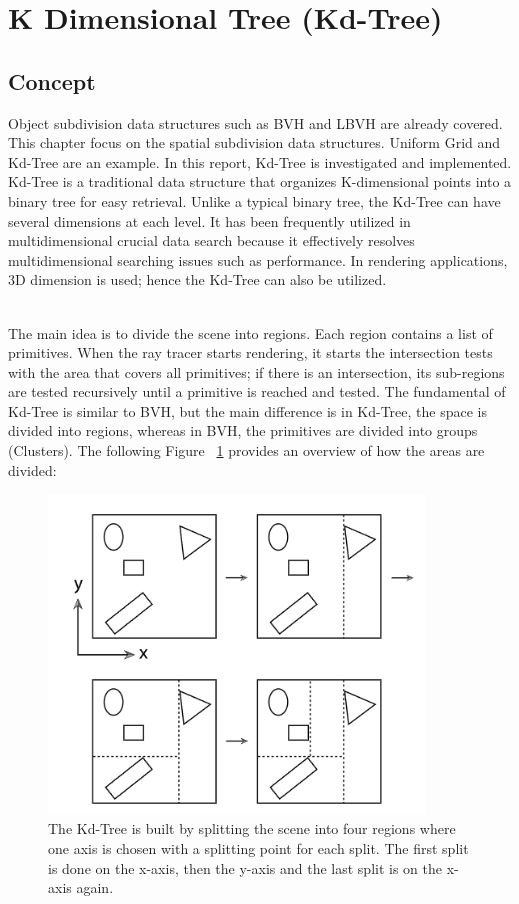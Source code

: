 \documentclass[11pt,a4paper]{article}
\begin{document}
\section{K Dimensional Tree (Kd-Tree)}
\subsection{Concept}
Object subdivision data structures such as BVH and LBVH are already covered. This chapter focus on the spatial subdivision data structures. Uniform Grid and Kd-Tree are an example. In this report, Kd-Tree is investigated and implemented. Kd-Tree is a traditional data structure that organizes K-dimensional points into a binary tree for easy retrieval. Unlike a typical binary tree, the Kd-Tree can have several dimensions at each level. It has been frequently utilized in multidimensional crucial data search because it effectively resolves multidimensional searching issues such as performance. In rendering applications, 3D dimension is used; hence the Kd-Tree can also be utilized.

\noindent
\\
The main idea is to divide the scene into regions. Each region contains a list of primitives. When the ray tracer starts rendering, it starts the intersection tests with the area that covers all primitives; if there is an intersection, its sub-regions are tested recursively until a primitive is reached and tested. The fundamental of Kd-Tree is similar to BVH, but the main difference is in Kd-Tree, the space is divided into regions, whereas in BVH, the primitives are divided into groups (Clusters). The following Figure ~\ref{fig:kdtreedemo} provides an overview of how the areas are divided:



\begin{figure}[h]	
     \centering
     \captionsetup{justification=centering,margin=2cm}
     \includegraphics[width=10cm]{images/kdtree/example_demo.png}
     \caption{The Kd-Tree is built by splitting the scene into four regions where one axis is chosen with a splitting point for each split.  The first split is done on the x-axis, then the y-axis and the last split is on the x-axis again. \protect\cite{Pharr2016}}
        \label{fig:kdtreedemo}
\end{figure}
\end{document}
